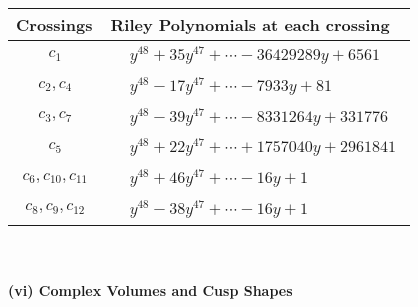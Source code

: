 \documentclass[1p]{elsarticle_modified}
\theoremstyle{definition}
\begin{document}
\begin{tabular}{m{50pt}|m{274pt}}
Crossings & \hspace{64pt}Riley Polynomials at each crossing \\
\hline $$\begin{aligned}c_{1}\end{aligned}$$&$\begin{aligned}
&y^{48}+35 y^{47}+\cdots-36429289 y+6561
\end{aligned}$\\
\hline $$\begin{aligned}c_{2},c_{4}\end{aligned}$$&$\begin{aligned}
&y^{48}-17 y^{47}+\cdots-7933 y+81
\end{aligned}$\\
\hline $$\begin{aligned}c_{3},c_{7}\end{aligned}$$&$\begin{aligned}
&y^{48}-39 y^{47}+\cdots-8331264 y+331776
\end{aligned}$\\
\hline $$\begin{aligned}c_{5}\end{aligned}$$&$\begin{aligned}
&y^{48}+22 y^{47}+\cdots+1757040 y+2961841
\end{aligned}$\\
\hline $$\begin{aligned}c_{6},c_{10},c_{11}\end{aligned}$$&$\begin{aligned}
&y^{48}+46 y^{47}+\cdots-16 y+1
\end{aligned}$\\
\hline $$\begin{aligned}c_{8},c_{9},c_{12}\end{aligned}$$&$\begin{aligned}
&y^{48}-38 y^{47}+\cdots-16 y+1
\end{aligned}$\\
\hline
\end{tabular}\\~\\
\newpage\flushleft \textbf{(vi) Complex Volumes and Cusp Shapes}
\end{document}

